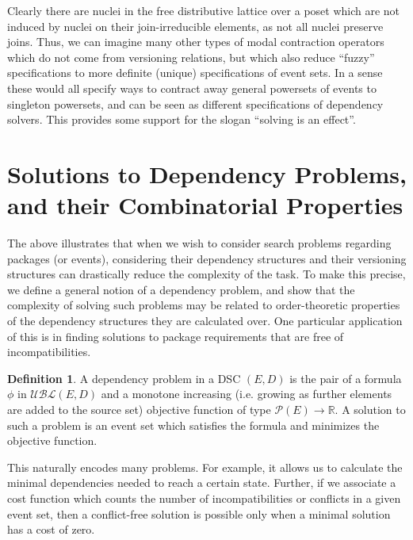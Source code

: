 \documentclass[hoptionsi,review,screen,format=sigconf]{acmart}
\theoremstyle{definition}
\newtheorem{definition}{Definition}[section]
\newcommand{\UBLc}{\mathcal{UBL}}
\newcommand{\Pc}{\mathcal{P}}
\begin{document}
Clearly there are nuclei in the free distributive lattice over a poset which are not induced by nuclei on their join-irreducible elements, as not all nuclei preserve joins. Thus, we can imagine many other types of modal contraction operators which do not come from versioning relations, but which also reduce ``fuzzy'' specifications to more definite (unique) specifications of event sets. In  a sense these would all specify ways to contract away general powersets of events to singleton powersets, and can be seen as different specifications of dependency solvers. This provides some support for the slogan ``solving is an effect''.

\section{Solutions to Dependency Problems, and their Combinatorial Properties}
The above illustrates that when we wish to consider search problems regarding packages (or events), considering their dependency structures and their versioning structures can drastically reduce the complexity of the task. To make this precise, we define a general notion of a dependency problem, and show that the complexity of solving such problems may be related to order-theoretic properties of the dependency structures they are calculated over. One particular application of this is in finding solutions to package requirements that are free of incompatibilities.

\begin{definition}
A dependency problem in a DSC \((E,D)\) is the pair of a formula \(\phi\) in \(\UBLc(E,D)\) and a monotone increasing (i.e. growing as further elements are added to the source set) objective function of type \(\Pc(E) \rightarrow \mathbb{R}\). A solution to such a problem is an event set which satisfies the formula and minimizes the objective function.
\end{definition}

This naturally encodes many problems. For example, it allows us to calculate the minimal dependencies needed to reach a certain state. Further, if we associate a cost function which counts the number of incompatibilities or conflicts in a given event set, then a conflict-free solution is possible only when a minimal solution has a cost of zero.
\end{document}
